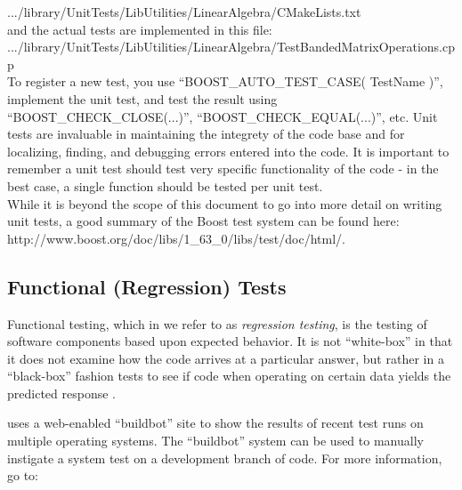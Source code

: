 .../library/UnitTests/LibUtilities/LinearAlgebra/CMakeLists.txt \\

and the actual tests are implemented in this file: \\

.../library/UnitTests/LibUtilities/LinearAlgebra/TestBandedMatrixOperations.cpp \\

To register a new test, you use ``BOOST\_AUTO\_TEST\_CASE( TestName )'',
implement the unit test, and test the result using
``BOOST\_CHECK\_CLOSE(...)'', ``BOOST\_CHECK\_EQUAL(...)'', etc. Unit
tests are invaluable in maintaining the integrety of the code base and
for localizing, finding, and debugging errors entered into the code. It is
important to remember a unit test should test very specific
functionality of the code - in the best case, a single function should be
tested per unit test. \\

While it is beyond the scope of this document to go into more detail
on writing unit tests, a good summary of the Boost test system can be
found here: http://www.boost.org/doc/libs/1\_63\_0/libs/test/doc/html/.


\subsection{Functional (Regression) Tests}
Functional testing, which in {\nek} we refer to as {\em regression testing},
is the testing of software components based upon expected
behavior.  It is not ``white-box'' in that it does not examine how the
code arrives at a particular answer, but rather in a ``black-box''
fashion tests to see if code when operating on certain data yields the
predicted response \cite{KFN-testing}.

{\nek} uses a web-enabled ``buildbot'' site to show the results of
recent test runs on multiple operating systems.  The ``buildbot''
system can be used to manually instigate a {\nek} system test on a
development branch of code.  For more information, go to:


%


